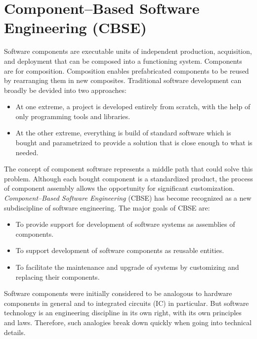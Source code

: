 
\section{Component--Based Software Engineering (CBSE)}

Software components are executable units of independent production, acquisition,
and deployment that can be composed into a functioning system.
Components are for composition.
Composition enables prefabricated components to be reused by rearranging them 
in new composites.
Traditional software development can broadly be devided into two approaches:
\begin{itemize}
\item At one extreme, a project is developed entirely from scratch, with the
help of only programming tools and libraries.

\item At the other extreme, everything is build of standard software which
is bought and parametrized to provide a solution that is close enough to what
is needed.
\end{itemize}

\noindent 
The concept of component software represents a middle path that could solve 
this problem.
Although each bought component is a standardized product, the process of
component assembly allows the opportunity for significant customization.
{\it Component--Based Software Engineering} (CBSE) 
\cite{Szyperski02,IVICA2002,CBSE2001}
has become recognized as a new subdiscipline of software engineering. 
The major goals of CBSE are:
\begin{itemize}
\item To provide support for development of software systems as assemblies of
	components.
\item To support development of software components as reusable entities.
\item To facilitate the maintenance and upgrade of systems by customizing
   	and replacing their components.
\end{itemize}

\noindent
Software components were initially considered to be analogous to hardware
components in general and to integrated circuits (IC) in particular.
But software technology is an engineering discipline in its own right, with its
own principles and laws. Therefore, such analogies break down quickly when 
going into technical details.



